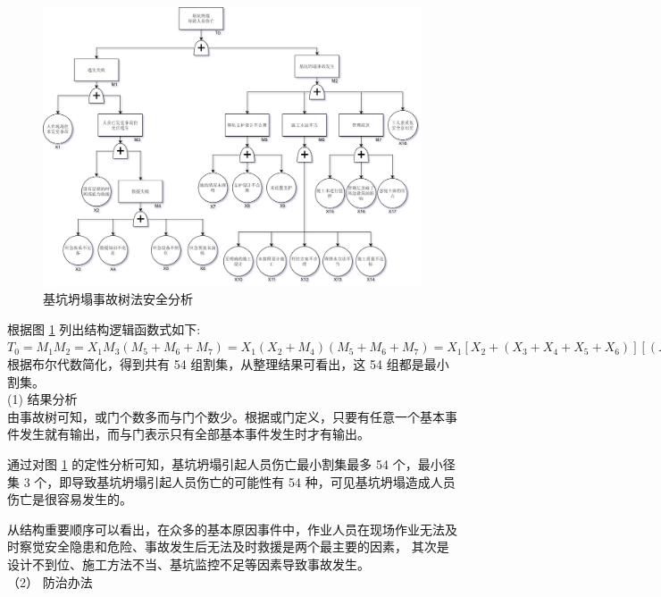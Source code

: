 \begin{figure}[thbp!]
    \centering
    \includegraphics[width=1.0\linewidth]{figure/c3f2.png}
    \caption{基坑坍塌事故树法安全分析}
    \label{fig:c3f1}
\end{figure}

根据图 \ref{fig:c3f1} 列出结构逻辑函数式如下:\\

$T_0=M_1M_2=X_1M_3(M_5+M_6+M_7)=X_1(X_2+M_4)(M_5+M_6+M_7)=X_1[X_2+(X_3+X_4+X_5+X_6)][(X_7+X_8+X_9)+(X_{10}+X_{11}+X_{12}+X_{13}+X_{14})+(X_{15}+X_{16}+X_{17})+X_{18}]$\\

根据布尔代数简化，得到共有 54 组割集，从整理结果可看出，这 54 组都是最小割集。\\

(1) 结果分析\\

 由事故树可知，或门个数多而与门个数少。根据或门定义，只要有任意一个基本事件发生就有输出，而与门表示只有全部基本事件发生时才有输出。

 通过对图 \ref{fig:c3f1} 的定性分析可知，基坑坍塌引起人员伤亡最小割集最多 54 个，最小径集 3 个，即导致基坑坍塌引起人员伤亡的可能性有 54 种，可见基坑坍塌造成人员伤亡是很容易发生的。

 从结构重要顺序可以看出，在众多的基本原因事件中，作业人员在现场作业无法及时察觉安全隐患和危险、事故发生后无法及时救援是两个最主要的因素，
其次是设计不到位、施工方法不当、基坑监控不足等因素导致事故发生。\\

（2） 防治办法\\

